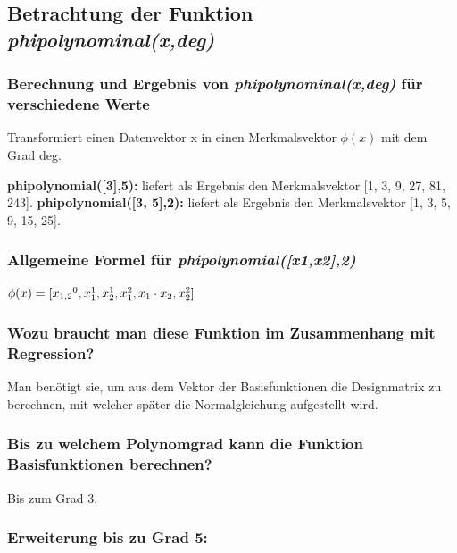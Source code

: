 \subsection{
    Betrachtung der Funktion \textit{phi\textunderscore polynominal(x,deg)}
}

\subsubsection{ Berechnung und Ergebnis von \textit{phi\textunderscore polynominal(x,deg)} für verschiedene Werte}

Transformiert einen Datenvektor x in einen Merkmalsvektor $\phi (x)$ mit dem Grad deg. 

\noindent
\textbf{phi\textunderscore polynomial([3],5):} liefert als Ergebnis den Merkmalsvektor [1, 3, 9, 27, 81, 243].
\noindent
\textbf{phi\textunderscore polynomial([3, 5],2):} liefert als Ergebnis den Merkmalsvektor [1, 3, 5, 9, 15, 25].

\subsubsection{ Allgemeine Formel für \textit{phi\textunderscore polynomial([x1,x2],2)} }

\begin{center}
    $\phi (x) = [x\textsubscript{1,2}^0, x_1^1, x_2^1, x_1^2, x_1\cdot x_2, x_2^2]$
\end{center}

\subsubsection{ Wozu braucht man diese Funktion im Zusammenhang mit Regression? }

\noindent
 \vspace{0px}
Man benötigt sie, um aus dem Vektor der Basisfunktionen die Designmatrix zu berechnen, mit welcher später die Normalgleichung aufgestellt wird. 

\subsubsection{ Bis zu welchem Polynomgrad kann die Funktion Basisfunktionen berechnen? }

\noindent
 \vspace{0px}
Bis zum Grad 3.

\subsubsection{ Erweiterung bis zu Grad 5: }

